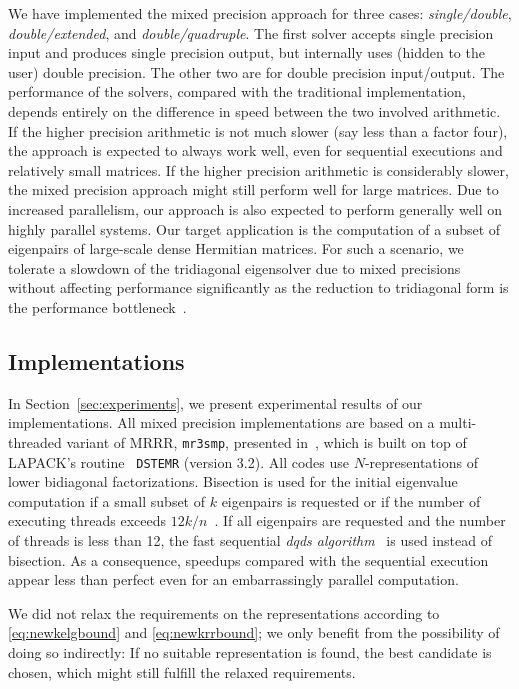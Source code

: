 \documentclass[final]{siamltex}
\begin{document}
We have implemented the mixed precision approach for three cases:
{\it single/double}, {\it double/extended}, and {\it double/quadruple}. The
first solver accepts single precision input and produces single precision
output, but internally uses (hidden to the user) double precision. The
other two are for double precision input/output. The performance of the
solvers, compared with the traditional implementation, depends entirely on
the difference in speed between the two involved arithmetic. 
If the higher precision arithmetic is not much slower (say less
than a factor four), the approach is expected to always work well, even for
sequential executions and relatively small matrices. If the higher
precision arithmetic is considerably slower, the mixed precision approach
might still perform well for large 
matrices. Due to increased parallelism, our approach is also
expected to perform generally well on highly parallel systems. 
Our target application is the computation of a subset of eigenpairs of
large-scale dense Hermitian matrices. For such a scenario, we 
tolerate a slowdown of the tridiagonal eigensolver due to mixed precisions
without affecting performance significantly as the reduction to tridiagonal
form is the performance bottleneck~\cite{EleMRRR,mixedtr}.

\subsection{Implementations}
In Section~\ref{sec:experiments}, we present experimental results of our
implementations. All mixed precision implementations are based on a 
multi-threaded variant of MRRR, {\tt mr3smp}, presented
in~\cite{mr3smp,para2010}, which is built on top of LAPACK's routine {\tt
  DSTEMR} (version 3.2). All codes use
$N$-representations of lower bidiagonal 
factorizations. Bisection is used
for the initial eigenvalue computation if a small 
subset of $k$ eigenpairs is requested or if the
number of executing threads exceeds $12k/n$~\cite{DesignMRRR,mr3smp}. If
all eigenpairs are requested and the number of threads is less than 12, the fast
sequential {\it dqds algorithm}~\cite{AccurateSVDandQDtrans,dqds99} is used
instead of bisection. As a consequence, speedups compared with the sequential
execution appear less than perfect even for an embarrassingly parallel
computation. 

We did not relax the requirements on the representations
according to \eqref{eq:newkelgbound} and \eqref{eq:newkrrbound}; we only
benefit from the possibility of 
doing so indirectly: If no suitable 
representation is found, the best candidate is chosen, which might still
fulfill the relaxed requirements.  
\end{document}
